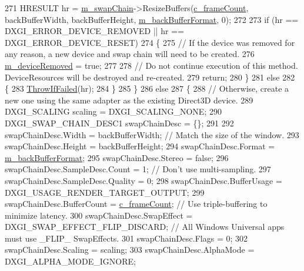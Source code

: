 \begin{DoxyCode}
271         HRESULT hr = \mbox{\hyperlink{class_d_x_1_1_device_resources_a8f067c81561cd51ac8e59a89e868571b}{m\_swapChain}}->ResizeBuffers(\mbox{\hyperlink{namespace_d_x_a13eecb6f150dc97fc5c7c8597377d0fb}{c\_frameCount}}, backBufferWidth, 
      backBufferHeight, \mbox{\hyperlink{class_d_x_1_1_device_resources_a9f23666e062bdebe694eb2dd7e454cba}{m\_backBufferFormat}}, 0);
272 
273         \textcolor{keywordflow}{if} (hr == DXGI\_ERROR\_DEVICE\_REMOVED || hr == DXGI\_ERROR\_DEVICE\_RESET)
274         \{
275             \textcolor{comment}{// If the device was removed for any reason, a new device and swap chain will need to be
       created.}
276             \mbox{\hyperlink{class_d_x_1_1_device_resources_af4d113c651dcae9a344094cfc02a6a09}{m\_deviceRemoved}} = \textcolor{keyword}{true};
277 
278             \textcolor{comment}{// Do not continue execution of this method. DeviceResources will be destroyed and re-created.}
279             \textcolor{keywordflow}{return};
280         \}
281         \textcolor{keywordflow}{else}
282         \{
283             \mbox{\hyperlink{_direct_x_helper_8h_abca3eeca6b5772a1112e0a9a9e3d9013}{ThrowIfFailed}}(hr);
284         \}
285     \}
286     \textcolor{keywordflow}{else}
287     \{
288         \textcolor{comment}{// Otherwise, create a new one using the same adapter as the existing Direct3D device.}
289         DXGI\_SCALING scaling = DXGI\_SCALING\_NONE;
290         DXGI\_SWAP\_CHAIN\_DESC1 swapChainDesc = \{\};
291 
292         swapChainDesc.Width = backBufferWidth;                      \textcolor{comment}{// Match the size of the window.}
293         swapChainDesc.Height = backBufferHeight;
294         swapChainDesc.Format = \mbox{\hyperlink{class_d_x_1_1_device_resources_a9f23666e062bdebe694eb2dd7e454cba}{m\_backBufferFormat}};
295         swapChainDesc.Stereo = \textcolor{keyword}{false};
296         swapChainDesc.SampleDesc.Count = 1;                         \textcolor{comment}{// Don't use multi-sampling.}
297         swapChainDesc.SampleDesc.Quality = 0;
298         swapChainDesc.BufferUsage = DXGI\_USAGE\_RENDER\_TARGET\_OUTPUT;
299         swapChainDesc.BufferCount = \mbox{\hyperlink{namespace_d_x_a13eecb6f150dc97fc5c7c8597377d0fb}{c\_frameCount}};                   \textcolor{comment}{// Use triple-buffering to
       minimize latency.}
300         swapChainDesc.SwapEffect = DXGI\_SWAP\_EFFECT\_FLIP\_DISCARD;   \textcolor{comment}{// All Windows Universal apps must use
       \_FLIP\_ SwapEffects.}
301         swapChainDesc.Flags = 0;
302         swapChainDesc.Scaling = scaling;
303         swapChainDesc.AlphaMode = DXGI\_ALPHA\_MODE\_IGNORE;

\end{DoxyCode}

